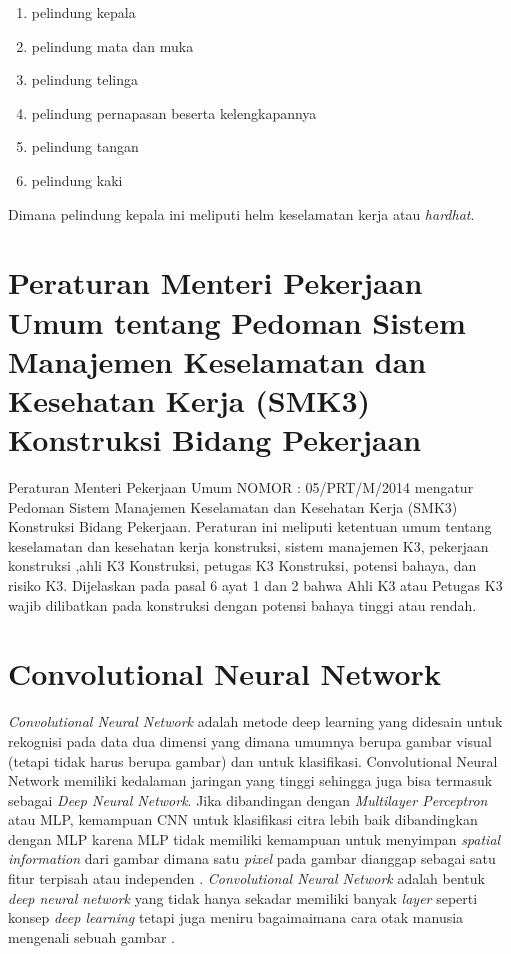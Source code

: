 \begin{enumerate}[nolistsep]
    \item pelindung kepala
    \item pelindung mata dan muka
    \item pelindung telinga
    \item pelindung pernapasan beserta kelengkapannya
    \item pelindung tangan
    \item pelindung kaki
\end{enumerate}
Dimana pelindung kepala ini meliputi helm keselamatan kerja atau \emph{hardhat}.

\section{Peraturan Menteri Pekerjaan Umum tentang Pedoman Sistem Manajemen Keselamatan dan Kesehatan Kerja (SMK3) Konstruksi Bidang Pekerjaan}
\label{sec:peraturansmk3}

\par Peraturan Menteri Pekerjaan Umum NOMOR : 05/PRT/M/2014 mengatur Pedoman Sistem Manajemen Keselamatan dan Kesehatan Kerja (SMK3) Konstruksi Bidang Pekerjaan.
Peraturan ini meliputi ketentuan umum tentang keselamatan dan kesehatan kerja konstruksi, sistem manajemen K3, pekerjaan konstruksi
,ahli K3 Konstruksi, petugas K3 Konstruksi, potensi bahaya, dan risiko K3. Dijelaskan pada pasal 6 ayat 1 dan 2 bahwa Ahli K3 atau Petugas K3 wajib dilibatkan pada konstruksi
dengan potensi bahaya tinggi atau rendah.


\section{Convolutional Neural Network}
\label{sec:convolutionalneuralnetwork}

\par \emph{Convolutional Neural Network} adalah metode deep learning yang didesain untuk rekognisi pada data dua 
dimensi yang dimana umumnya berupa gambar visual (tetapi tidak harus berupa gambar) dan untuk klasifikasi.
Convolutional Neural Network memiliki kedalaman jaringan yang tinggi sehingga juga bisa termasuk sebagai \emph{Deep Neural Network}.
Jika dibandingan dengan \emph{Multilayer Perceptron} atau MLP, kemampuan CNN untuk klasifikasi citra lebih baik dibandingkan dengan MLP karena MLP tidak memiliki
kemampuan untuk menyimpan \emph{spatial information} dari gambar dimana satu \emph{pixel} pada gambar dianggap sebagai satu fitur
terpisah atau independen \cite{putra2016klasifikasi}. \emph{Convolutional Neural Network} adalah bentuk \emph{deep neural network} yang tidak hanya
sekadar memiliki banyak \emph{layer} seperti konsep \emph{deep learning} tetapi juga meniru bagaimaimana cara otak manusia mengenali sebuah gambar \cite{kim2017convolutional}.

